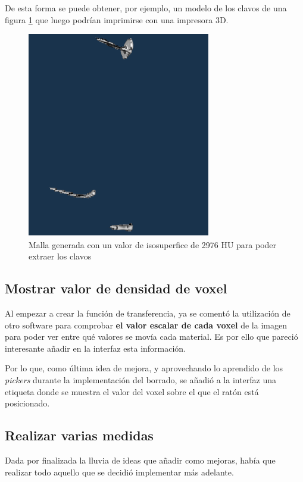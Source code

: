 De esta forma se puede obtener, por ejemplo, un modelo de los clavos de una figura \ref{fig:malla_clavos} que luego podrían imprimirse con una impresora 3D.

\begin{figure}[H]
	\centering
	\includegraphics[width=8cm]{imagenes/malla_clavos}
	\caption{Malla generada con un valor de isosuperfice de 2976 HU para poder extraer los clavos}
	\label{fig:malla_clavos}
\end{figure}

\subsection{Mostrar valor de densidad de voxel}

Al empezar a crear la función de transferencia, ya se comentó la utilización de otro software para comprobar \textbf{el valor escalar de cada voxel} de la imagen para poder ver entre qué valores se movía cada material. Es por ello que pareció interesante añadir en la interfaz esta información.

Por lo que, como última idea de mejora, y aprovechando lo aprendido de los \textit{pickers} durante la implementación del borrado, se añadió a la interfaz una etiqueta donde se muestra el valor del voxel sobre el que el ratón está posicionado.

\subsection{Realizar varias medidas}

Dada por finalizada la lluvia de ideas que añadir como mejoras, había que realizar todo aquello que se decidió implementar más adelante.

